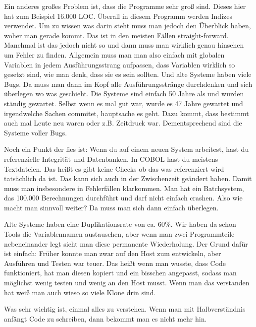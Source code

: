 {Ein anderes großes Problem ist, dass die Programme sehr groß sind. Dieses hier hat zum Beispiel 16.000 LOC. Überall in diesem Programm werden Indizes verwendet. Um zu wissen was darin steht muss man jedoch den Überblick haben, woher man gerade kommt. Das ist in den meisten Fällen straight-forward. Manchmal ist das jedoch nicht so und dann muss man wirklich genau hinsehen um Fehler zu finden. Allgemein muss man man also einfach mit globalen Variablen in jedem Ausführungsstrang aufpassen, dass Variablen wirklich so gesetzt sind, wie man denk, dass sie es sein sollten. Und alte Systeme haben viele Bugs. Da muss man dann im Kopf alle Ausführungsstränge durchdenken und sich überlegen wo was geschieht. Die Systeme sind einfach 50 Jahre als und wurden ständig gewartet. Selbst wenn es mal gut war, wurde es 47 Jahre gewartet und irgendwelche Sachen commitet, hauptsache es geht. Dazu kommt, dass bestimmt auch mal Leute neu waren oder z.B. Zeitdruck war. Dementsprechend sind die Systeme voller Bugs. 

Noch ein Punkt der fies ist: Wenn du auf einem neuen System arbeitest, hast du referenzielle Integrität und Datenbanken. In COBOL hast du meistens Textdateien. Das heißt es gibt keine Checks ob das was referenziert wird tatsächlich da ist. Das kann sich auch in der Zwischenzeit geändert haben. Damit muss man insbesondere in Fehlerfällen klarkommen. Man hat ein Batchsystem, das 100.000 Berechnungen durchführt und darf nicht einfach crashen. Also wie macht man sinnvoll weiter? Da muss man sich dann einfach überlegen. 

Alte Systeme haben eine Duplikationsrate von ca. 60\%. Wir haben da schon Tools die Variablennamen austauschen, aber wenn man zwei Programmteile nebeneinander legt sieht man diese permanente Wiederholung. Der Grund dafür ist einfach: Früher konnte man zwar auf den Host zum entwickeln, aber Ausführen und Testen war teuer. Das heißt wenn man wusste, dass Code funktioniert, hat man diesen kopiert und ein bisschen angepasst, sodass man möglichst wenig testen und wenig an den Host musst. Wenn man das verstanden hat weiß man auch wieso so viele Klone drin sind. 

Was sehr wichtig ist, einmal alles zu verstehen. Wenn man mit Halbverständnis anfängt Code zu schreiben, dann bekommt man es nicht mehr hin. 
}
